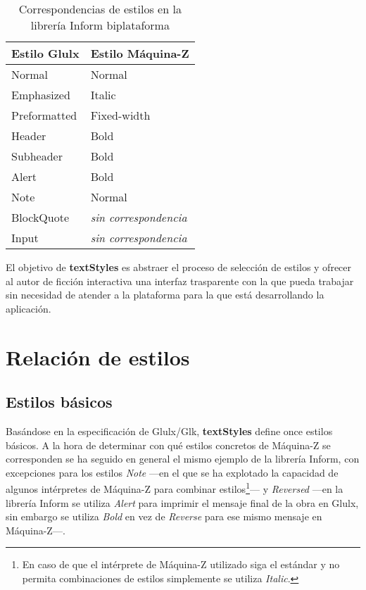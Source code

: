 \documentclass[a4paper,12pt]{article}
\numberwithin{equation}{section}
\begin{document}
\begin{table}[]
\centering
\begin{tabular}{ll}
\hline
\textbf{Estilo Glulx}	& \textbf{Estilo Máquina-Z}		\\ \hline
Normal					& Normal						\\
Emphasized				& Italic						\\
Preformatted			& Fixed-width					\\
Header					& Bold							\\
Subheader				& Bold							\\
Alert					& Bold							\\
Note					& Normal						\\
BlockQuote				& \emph{sin correspondencia}	\\
Input					& \emph{sin correspondencia}	\\ \hline
\end{tabular}
\caption{Correspondencias de estilos en la librería Inform biplataforma}
\label{table:correspondencias-estilos-glulx-z}
\end{table}

El objetivo de \textbf{textStyles} es abstraer el proceso de selección de estilos y ofrecer al autor de ficción interactiva una interfaz trasparente con la que pueda trabajar sin necesidad de atender a la plataforma para la que está desarrollando la aplicación.



\section{Relación de estilos} \label{sec:relacion-estilos}

\subsection{Estilos básicos} \label{sec:estilos-basicos}

Basándose en la especificación de Glulx/Glk, \textbf{textStyles} define once estilos básicos. A la hora de determinar con qué estilos concretos de Máquina-Z se corresponden se ha seguido en general el mismo ejemplo de la librería Inform, con excepciones para los estilos \emph{Note} ---en el que se ha explotado la capacidad de algunos intérpretes de Máquina-Z para combinar estilos\footnote{En caso de que el intérprete de Máquina-Z utilizado siga el estándar y no permita combinaciones de estilos simplemente se utiliza \emph{Italic}.}--- y \emph{Reversed} ---en la librería Inform se utiliza \emph{Alert} para imprimir el mensaje final de la obra en Glulx, sin embargo se utiliza \emph{Bold} en vez de \emph{Reverse} para ese mismo mensaje en Máquina-Z---.
\end{document}
